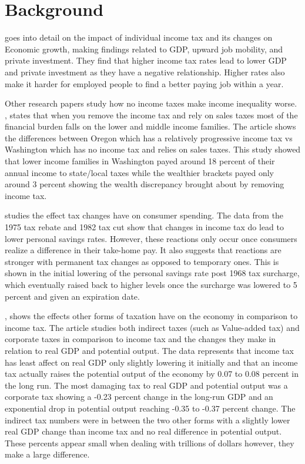 \documentclass[12pt,letterpaper]{article}
\begin{document}
 
\section{Background}

\indent \cite{Vermeer_Timothy} goes into detail on the impact of individual income tax and its changes on Economic growth, making findings related to GDP, upward job mobility, and private investment. They find that higher income tax rates lead to lower GDP and private investment as they have a negative relationship. Higher rates also make it harder for employed people to find a better paying job within a year.  

\indent Other research papers study how no income taxes make income inequality worse. \cite{Hellmann_Melissa}, states that when you remove the income tax and rely on sales taxes most of the financial burden falls on the lower and middle income families. The article shows the differences between Oregon which has a relatively progressive income tax vs Washington which has no income tax and relies on sales taxes. This study showed that lower income families in Washington payed around 18 percent of their annual income to state/local taxes while the wealthier brackets payed only around 3 percent showing the wealth discrepancy brought about by removing income tax.

\indent \cite{Steindel_Charles} studies the effect tax changes have on consumer spending. The data from the 1975 tax rebate and 1982 tax cut show that changes in income tax do lead to lower personal savings rates. However, these reactions only occur once consumers realize a difference in their take-home pay. It also suggests that reactions are stronger with permanent tax changes as opposed to temporary ones. This is shown in the initial lowering of the personal savings rate post 1968 tax surcharge, which eventually raised back to higher levels once the surcharge was lowered to 5 percent and given an expiration date.

\indent \cite{Cornforth_Ed}, shows the effects other forms of taxation have on the economy in comparison to income tax. The article studies both indirect taxes (such as Value-added tax) and corporate taxes in comparison to income tax and the changes they make in relation to real GDP and potential output. The data represents that income tax has least affect on real GDP only slightly lowering it initially and that an income tax actually raises the potential output of the economy by 0.07 to 0.08 percent in the long run. The most damaging tax to real GDP and potential output was a corporate tax showing a -0.23 percent change in the long-run GDP and an exponential drop in potential output reaching -0.35 to -0.37 percent change. The indirect tax numbers were in between the two other forms with a slightly lower real GDP change than income tax and no real difference in potential output. These percents appear small when dealing with trillions of dollars however, they make a large difference.
\end{document}
